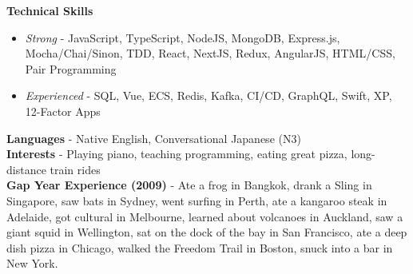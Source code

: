 
\begin{cvparagraph}

  \textbf{Technical Skills}
  \begin{itemize}[noitemsep, topsep=-0.6em, leftmargin=1.5em]
    \item {\textit{Strong} - JavaScript, TypeScript, NodeJS, MongoDB, Express.js, Mocha/Chai/Sinon, TDD, React, NextJS, Redux, AngularJS, HTML/CSS, Pair Programming}
    \item {\textit{Experienced} - SQL, Vue, ECS, Redis, Kafka, CI/CD, GraphQL, Swift, XP, 12-Factor Apps}
  \end{itemize}

  \textbf{Languages} - Native English, Conversational Japanese (N3)\\
  \textbf{Interests} - Playing piano, teaching programming, eating great pizza, long-distance train rides\\
  \textbf{Gap Year Experience (2009)} - Ate a frog in Bangkok, drank a Sling in Singapore, saw bats in Sydney, went surfing in Perth, ate a kangaroo steak in Adelaide, got cultural in Melbourne, learned about volcanoes in Auckland, saw a giant squid in Wellington, sat on the dock of the bay in San Francisco, ate a deep dish pizza in Chicago, walked the Freedom Trail in Boston, snuck into a bar in New York.

\end{cvparagraph}
